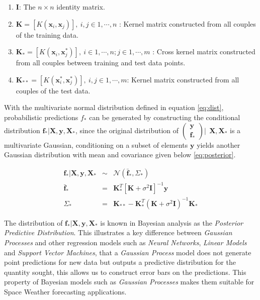 \documentclass[referee,a4paper,12pt,traditabstract]{swsc}
\begin{document}
\begin{linenumbers}
\begin{enumerate}
      \item $\mathbf{I}$: The $n \times n$ identity matrix.
      \item $\mathbf{K} = [K(\mathbf{x}_i, \mathbf{x}_j)], \ i,j \in 1,\cdots,n$ : Kernel matrix constructed from all couples of the training data.
      \item $\mathbf{K}_{*} = [K(\mathbf{x}_i, \mathbf{x}^{*}_j)], \ i \in 1,\cdots,n ; j \in 1,\cdots,m$ : Cross kernel matrix constructed from all couples between training and test data points.
      \item $\mathbf{K}_{**} = [K(\mathbf{x}^{*}_i, \mathbf{x}^{*}_j)], \ i,j \in 1,\cdots,m$: Kernel matrix constructed from all couples of the test data.
\end{enumerate}

With the multivariate normal distribution defined in equation \ref{eq:dist}, probabilistic predictions $f_*$ can be generated by constructing the conditional distribution $\mathbf{f_*}|\mathbf{X},\mathbf{y},\mathbf{X_*}$, since the original distribution of $\left( \begin{array}{c} \mathbf{y} \\ \mathbf{f_*} \end{array} \right) | \ \ \mathbf{X}, \mathbf{X}_*$ is a multivariate Gaussian, conditioning on a subset of elements $\mathbf{y}$ yields another Gaussian distribution with mean and covariance given below \ref{eq:posterior}.

\begin{eqnarray}
    \mathbf{f_*}|\mathbf{X},\mathbf{y},\mathbf{X_*} & \sim & \mathcal{N}(\mathbf{\bar{f}_*}, \Sigma_*)  \label{eq:posterior} \\
    \mathbf{\bar{f}_*} & = & \mathbf{K}^T_{*} [\mathbf{K} + \sigma^{2} \mathbf{I}]^{-1} \mathbf{y} \label{eq:posteriormean} \\
    \Sigma_* & = & \mathbf{K}_{**} - \mathbf{K}^T_{*} \left(\mathbf{K} + \sigma^{2} \mathbf{I}\right)^{-1} \mathbf{K}_{*} \label{eq:posteriorcov}
\end{eqnarray}

The distribution of $\mathbf{f_*}| \mathbf{X},\mathbf{y},\mathbf{X_*}$ is known in Bayesian analysis as the \emph{Posterior Predictive Distribution}. This illustrates a key difference between \emph{Gaussian Processes} and other regression models such as \emph{Neural Networks}, \emph{Linear Models} and \emph{Support Vector Machines}, that a \emph{Gaussian Process} model does not generate point predictions for new data but outputs a predictive distribution for the quantity sought, this allows us to construct error bars on the predictions. This property of Bayesian models such as \emph{Gaussian Processes} makes them suitable for Space Weather forecasting applications. 


\end{linenumbers}
\end{document}
